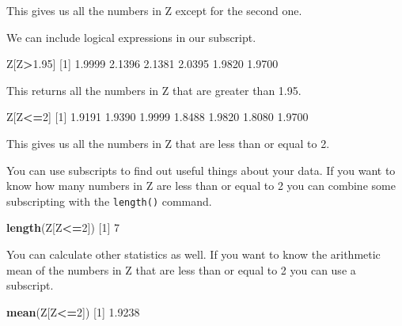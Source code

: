 \documentclass[
]{book}
\newenvironment{Shaded}{\begin{snugshade}}{\end{snugshade}}
\newcommand{\DecValTok}[1]{\textcolor[rgb]{0.00,0.00,0.81}{#1}}
\newcommand{\FloatTok}[1]{\textcolor[rgb]{0.00,0.00,0.81}{#1}}
\newcommand{\KeywordTok}[1]{\textcolor[rgb]{0.13,0.29,0.53}{\textbf{#1}}}
\newcommand{\NormalTok}[1]{#1}
\newcommand{\OperatorTok}[1]{\textcolor[rgb]{0.81,0.36,0.00}{\textbf{#1}}}
\begin{document}
This gives us all the numbers in Z except for the second one.

We can include logical expressions in our subscript.

\begin{Shaded}
\begin{Highlighting}[]
\NormalTok{Z[Z}\OperatorTok{>}\FloatTok{1.95}\NormalTok{]}
\NormalTok{[}\DecValTok{1}\NormalTok{] }\FloatTok{1.9999} \FloatTok{2.1396} \FloatTok{2.1381} \FloatTok{2.0395} \FloatTok{1.9820} \FloatTok{1.9700}
\end{Highlighting}
\end{Shaded}

This returns all the numbers in Z that are greater than 1.95.

\begin{Shaded}
\begin{Highlighting}[]
\NormalTok{Z[Z}\OperatorTok{<=}\DecValTok{2}\NormalTok{]}
\NormalTok{[}\DecValTok{1}\NormalTok{] }\FloatTok{1.9191} \FloatTok{1.9390} \FloatTok{1.9999} \FloatTok{1.8488} \FloatTok{1.9820} \FloatTok{1.8080} \FloatTok{1.9700}
\end{Highlighting}
\end{Shaded}

This gives us all the numbers in Z that are less than or equal to 2.

You can use subscripts to find out useful things about your data. If you want to know how many numbers in Z are less than or equal to 2 you can combine some subscripting with the \texttt{length()} command.

\begin{Shaded}
\begin{Highlighting}[]
\KeywordTok{length}\NormalTok{(Z[Z}\OperatorTok{<=}\DecValTok{2}\NormalTok{])}
\NormalTok{[}\DecValTok{1}\NormalTok{] }\DecValTok{7}
\end{Highlighting}
\end{Shaded}

You can calculate other statistics as well. If you want to know the arithmetic mean of the numbers in Z that are less than or equal to 2 you can use a subscript.

\begin{Shaded}
\begin{Highlighting}[]
\KeywordTok{mean}\NormalTok{(Z[Z}\OperatorTok{<=}\DecValTok{2}\NormalTok{])}
\NormalTok{[}\DecValTok{1}\NormalTok{] }\FloatTok{1.9238}
\end{Highlighting}
\end{Shaded}
\end{document}
